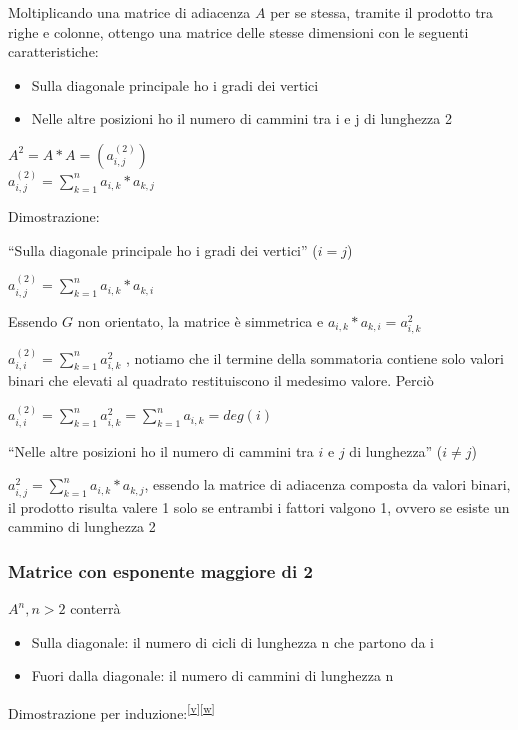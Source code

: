 \documentclass[tikz]{article}
\providecommand{\tightlist}{%
  \setlength{\itemsep}{0pt}\setlength{\parskip}{0pt}}
\begin{document}
{{{Moltiplicando una matrice di adiacenza $A$ per se stessa, tramite il prodotto tra righe e colonne, ottengo una matrice delle stesse dimensioni con le seguenti caratteristiche:}

\begin{itemize}
\tightlist
\item
  {Sulla diagonale principale ho i gradi dei vertici}
\item
  {Nelle altre posizioni ho il numero di cammini tra i e j di lunghezza
  2}
\end{itemize}

$A^2 = A*A = (a^{(2)}_{i,j})$ \\
$a^{(2)}_{i,j}=\sum_{k=1}^{n}{a_{i,k}*a_{k,j}}$

{Dimostrazione:}

{``Sulla diagonale principale ho i gradi dei vertici'' ($i=j$)}

$a^{(2)}_{i,j}=\sum_{k=1}^{n}{a_{i,k}*a_{k,i}}$

{Essendo $G$ non orientato, la matrice è simmetrica e $a_{i,k}*a_{k,i} = a^2_{i,k}$}

{$a^{(2)}_{i,i} = \sum^n_{k=1}{a^2_{i,k}}$ , notiamo che il termine della sommatoria contiene solo valori binari che elevati al quadrato restituiscono il medesimo valore. Perciò}

$a^{(2)}_{i,i} = \sum^n_{k=1}{a^2_{i,k}} = \sum^n_{k=1}{a_{i,k}} = deg(i)$

{``Nelle altre posizioni ho il numero di cammini tra $i$ e $j$ di lunghezza'' ($i\neq j$)}

{$a^2_{i,j}=\sum_{k=1}^{n}{a_{i,k}*a_{k,j}}$, essendo la matrice di adiacenza composta da valori binari, il prodotto risulta valere 1 solo se entrambi i fattori valgono 1, ovvero se esiste un cammino di lunghezza 2}

\subsubsection{Matrice con esponente maggiore di 2}

{$A^n, n > 2$ conterrà}

\begin{itemize}
\tightlist
\item
  {Sulla diagonale: il numero di cicli di lunghezza n che partono da i}
\item
  {Fuori dalla diagonale: il numero di cammini di lunghezza n}
\end{itemize}

{Dimostrazione per induzione:}\textsuperscript{\protect\hyperlink{cmnt22}{{[}v{]}}\protect\hyperlink{cmnt23}{{[}w{]}}}

}}
\end{document}
